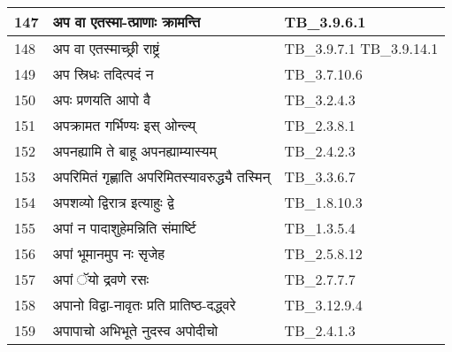 \documentclass[17pt]{extarticle}
\begin{document}
\begin{longtable}{||p{0.4in}||p{4.9in}||p{0.9in}||}
    \hline
        
    147 & अप वा एतस्मा{-}त्प्राणाः क्रामन्ति & TB\_3.9.6.1       \\
    
    \hline
        
    148 & अप वा एतस्माच्छ्री राष्ट्रं & TB\_3.9.7.1 TB\_3.9.14.1       \\
    
    \hline
        
    149 & अप स्रिधः तदित्पदं न & TB\_3.7.10.6       \\
    
    \hline
        
    150 & अपः प्रणयति आपो वै & TB\_3.2.4.3       \\
    
    \hline
        
    151 & अपक्रामत गर्भिण्यः इस् ओन्ल्य् & TB\_2.3.8.1       \\
    
    \hline
        
    152 & अपनह्यामि ते बाहू अपनह्याम्यास्यम् & TB\_2.4.2.3       \\
    
    \hline
        
    153 & अपरिमितं गृह्णाति अपरिमितस्यावरुद्ध्यै तस्मिन् & TB\_3.3.6.7       \\
    
    \hline
        
    154 & अपशव्यो द्विरात्र इत्याहुः द्वे & TB\_1.8.10.3       \\
    
    \hline
        
    155 & अपां न पादाशुहेमन्निति संमार्ष्टि & TB\_1.3.5.4       \\
    
    \hline
        
    156 & अपां भूमानमुप नः सृजेह & TB\_2.5.8.12       \\
    
    \hline
        
    157 & अपां ॅयो द्रवणे रसः & TB\_2.7.7.7       \\
    
    \hline
        
    158 & अपानो विद्वा{-}नावृतः प्रति प्रातिष्ठ{-}दद्ध्वरे & TB\_3.12.9.4       \\
    
    \hline
        
    159 & अपापाचो अभिभूते नुदस्व अपोदीचो & TB\_2.4.1.3       \\
    

\end{longtable}
\end{document}
